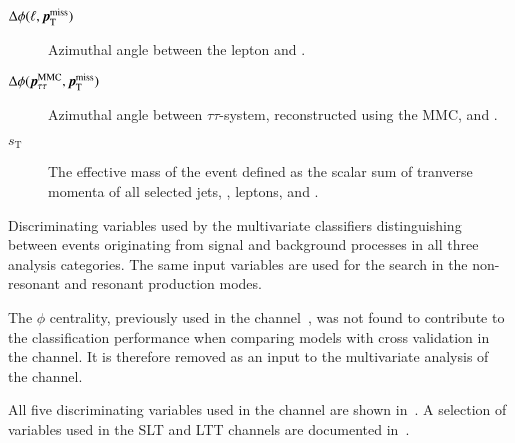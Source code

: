 \begin{description}
\item[$\Delta\phi(\ell, \pTmiss)$] Azimuthal angle between the lepton
  and \pTmiss.

\item[$\Delta\phi(\pTauTau, \pTmiss)$] Azimuthal angle between
  $\tau\tau$-system, reconstructed using the MMC, and \pTmiss.

\item[$s_{\text{T}}$] The effective mass of the event defined as the
  scalar sum of tranverse momenta of all selected jets, \tauhadvis,
  leptons, and \pTmissAbs.
\end{description}

\begin{table}[htbp]
  \centering

  \caption{Discriminating variables used by the multivariate
    classifiers distinguishing between events originating from signal
    and background processes in all three analysis categories. The
    same input variables are used for the search in the non-resonant
    and resonant production modes.}%
  \label{tab:mva_inputvar}

  
\end{table}

The \pTmiss $\phi$ centrality, previously used in the \hadhad
channel~\cite{HIGG-2016-16-witherratum}, was not found to contribute
to the classification performance when comparing models with cross
validation in the \hadhad channel. It is therefore removed as an input
to the multivariate analysis of the \hadhad channel.

All five discriminating variables used in the \hadhad channel are
shown in~. A selection of variables used in the
\lephad SLT and LTT channels are documented
in~\cite{ATLAS-CONF-2021-030}.



